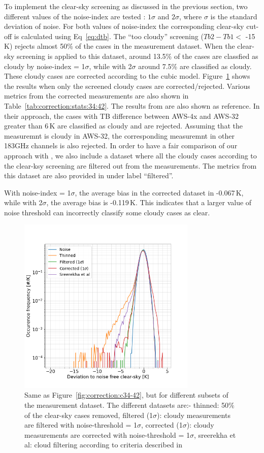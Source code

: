 \documentclass[12pt]{article}
\begin{document}
To implement the clear-sky screening as discussed in the previous section, two different values of the noise-index are tested : $1\sigma$ and  $2\sigma$, where $\sigma$ is the standard deviation of noise. For both values of noise-index the corresponding clear-sky cut-off is calculated using Eq~\ref{eq:dtb}. The ``too cloudy'' screening ($Tb2-Tb1 < $ -15\,K) rejects almost 50\% of the cases in the measurement dataset. When the clear-sky screening is applied to this dataset, around 13.5\% of the cases are classfied as cloudy by noise-index = 1$\sigma$, while with 2$\sigma$ around 7.5\% are classified as cloudy. These cloudy cases are corrected according to the cubic model. Figure~\ref{fig:correction:c34-42:thinned} shows the results when only the screened cloudy cases are corrected/rejected. Various metrics from the corrected measurements are also shown in Table~\ref{tab:correction:stats:34:42}. The results from \cite{rekha2012potential} are also shown as reference. In their approach, the cases with TB difference between AWS-4x and AWS-32 greater than 6\,K are classified as cloudy and are rejected. Assuming that the measuremnt is cloudy in AWS-32, the corresponding measuremnt in other 183GHz channels is also rejected. In order to have a fair comparison of our approach with  \cite{rekha2012potential}, we also include a dataset where all the cloudy cases according to the clear-ksy screening are filtered out from the measurements. The metrics from this dataset are also provided in under label ``filtered''. 

With noise-index = 1$\sigma$, the average bias in the corrected dataset in -0.067\,K, while with 2$\sigma$, the average bias is -0.119\,K. This indicates that a larger value of noise threshold can incorrectly classify some cloudy cases as clear. 
%
%
\begin{figure}[!tb]
	\centering
	\includegraphics[height=85mm]{PDF_corrected_AWS-34_AWS-42_thinned}
	\caption{Same as Figure~\ref{fig:correction:c34-42}, but for different subsets of the measurement dataset. The different datasets are:- thinned: 50\% of the clear-sky cases removed, filtered (1$\sigma$): cloudy measurements are filtered with noise-threshold = 1$\sigma$,   corrected (1$\sigma$): cloudy measurements are corrected with noise-threshold = 1$\sigma$, sreerekha et al: cloud filtering according to criteria described in \cite{rekha2012potential} }
	\label{fig:correction:c34-42:thinned}
\end{figure}
%
\end{document}
